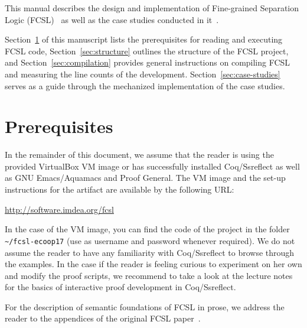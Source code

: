 %
This manual describes the design and implementation of Fine-grained
Separation Logic (FCSL)~\cite{Nanevski-al:ESOP14} as well as the case
studies conducted in
it~\cite{Sergey-al:ESOP15,Sergey-al:PLDI15,Sergey-al:OOPSLA16,
Delbianco-al:ECOOP17}.

Section~\ref{sec:prerequisites} of this manuscript lists the
prerequisites for reading and executing FCSL code,
Section~\ref{sec:structure} outlines the structure of the FCSL
project, and Section~\ref{sec:compilation} provides general
instructions on compiling FCSL and measuring the line counts of the
development.
%
Section~\ref{sec:case-studies} serves as a guide through the
mechanized implementation of the case studies.
%

\tableofcontents

\vspace{20pt}

\section{Prerequisites}
\label{sec:prerequisites}
%
In the remainder of this document, we assume that the reader is using
the provided VirtualBox VM image or has successfully installed
Coq/Ssreflect as well as GNU Emacs/Aquamacs and Proof General. The VM image and
the set-up instructions for the artifact are available by the
following URL:

\begin{center}
    \url{http://software.imdea.org/fcsl}
\end{center}

In the case of the VM image, you can find the code of the project in
the folder \texttt{\textasciitilde/fcsl-ecoop17} (use  as
username and password whenever required).  We do not assume the reader
to have any familiarity with Coq/Ssreflect to browse through the
examples. In the case if the reader is feeling curious to experiment
on her own and modify the proof scripts, we recommend to take a look
at the lecture notes~\cite{Sergey:PnP} for the basics of interactive
proof development in Coq/Ssreflect.

For the description of semantic foundations of FCSL in prose, we
address the reader to the appendices of the original FCSL
paper~\cite{Nanevski-al:ESOP14}.

